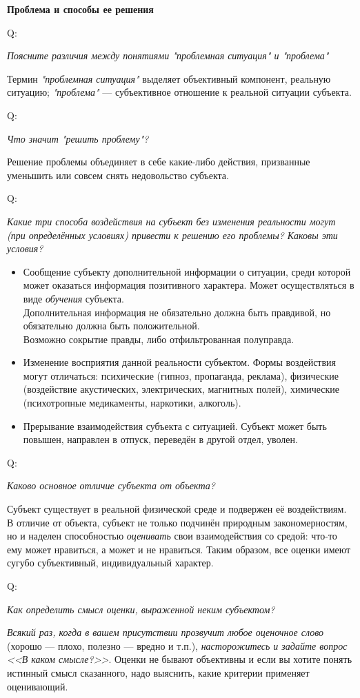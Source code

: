 \documentclass{article}
\newcommand{\note}[1]{\textit{#1}}
\renewcommand{\subsection}[1]{
	\vspace{2em}
	\begin{flushright}
		\large
		\textbf{#1}
	\end{flushright}
	}
\newcommand{\question}[2]{
	\begin{flushright}
		Q:\hspace{2ex}\vline\hspace{2ex}
		\begin{minipage}{0.9\textwidth}
			\large
			\textit{#1}
		\end{minipage}
	\end{flushright}
	\begin{center}
		\begin{minipage}{0.95\textwidth}
			#2
		\end{minipage}
	\end{center}
	}
\begin{document}
\subsection{Проблема и способы ее решения}
\question{Поясните различия между понятиями "проблемная ситуация" и "проблема"}{Термин \note{"проблемная ситуация"} выделяет объективный компонент, реальную ситуацию; \note{"проблема"} --- субъективное отношение к реальной ситуации субъекта.}
\question{Что значит "решить проблему"?}{Решение проблемы объединяет в себе какие-либо действия, призванные уменьшить или совсем снять недовольство субъекта.}
\question{Какие три способа воздействия на субъект без изменения реальности могут (при определённых условиях) привести к решению его проблемы? Каковы эти условия?}{
	\begin{itemize}
		\item Сообщение субъекту дополнительной информации о ситуации, среди которой может оказаться информация позитивного характера. Может осуществляться в виде \note{обучения} субъекта.\\Дополнительная информация не обязательно должна быть правдивой, но обязательно должна быть положительной.\\Возможно сокрытие правды, либо отфильтрованная полуправда.
		\item Изменение восприятия данной реальности субъектом. Формы воздействия могут отличаться: психические (гипноз, пропаганда, реклама), физические (воздействие акустических, электрических, магнитных полей), химические (психотропные медикаменты, наркотики, алкоголь).
		\item Прерывание взаимодействия субъекта с ситуацией. Субъект может быть повышен, направлен в отпуск, переведён в другой отдел, уволен.
	\end{itemize}}
\question{Каково основное отличие субъекта от объекта?}{Субъект существует в реальной физической среде и подвержен её воздействиям. В отличие от объекта, субъект не только подчинён природным закономерностям, но и наделен способностью \note{оценивать} свои взаимодействия со средой: что-то ему может нравиться, а может и не нравиться. Таким образом, все оценки имеют сугубо субъективный, индивидуальный характер.}
\question{Как определить смысл оценки, выраженной неким субъектом?}{\note{Всякий раз, когда в вашем присутствии прозвучит любое оценочное слово} (хорошо --- плохо, полезно --- вредно и т.п.), \note{насторожитесь и задайте вопрос <<В каком смысле?>>}. Оценки не бывают объективны и если вы хотите понять истинный смысл сказанного, надо выяснить, какие критерии применяет оценивающий.}
\end{document}
